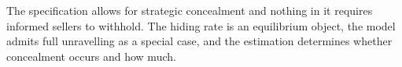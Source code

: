The specification allows for strategic concealment and nothing in it requires informed sellers to
withhold. The hiding rate is an equilibrium object, the model admits full unravelling as a special
case, and the estimation determines whether concealment occurs and how much.
